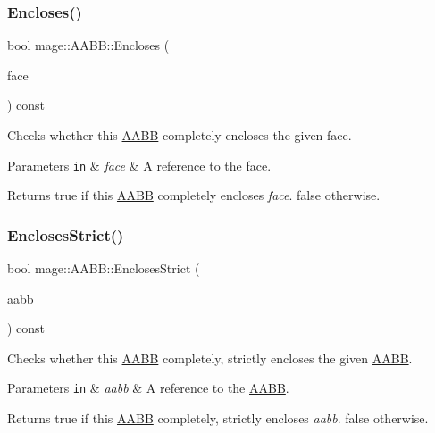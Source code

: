 \subsubsection{\texorpdfstring{Encloses()}{Encloses()}\hspace{0.1cm}{\footnotesize\ttfamily [3/3]}}
{\footnotesize\ttfamily bool mage\+::\+A\+A\+B\+B\+::\+Encloses (\begin{DoxyParamCaption}\item[{const \hyperlink{structmage_1_1_face}{Face} \&}]{face }\end{DoxyParamCaption}) const}

Checks whether this \hyperlink{structmage_1_1_a_a_b_b}{A\+A\+BB} completely encloses the given face.


\begin{DoxyParams}[1]{Parameters}
\mbox{\tt in}  & {\em face} & A reference to the face. \\
\hline
\end{DoxyParams}
\begin{DoxyReturn}{Returns}
{\ttfamily true} if this \hyperlink{structmage_1_1_a_a_b_b}{A\+A\+BB} completely encloses {\itshape face}. {\ttfamily false} otherwise. 
\end{DoxyReturn}
\hypertarget{structmage_1_1_a_a_b_b_a3bb59de6eca634cb3ddec4ad314fde21}{}\label{structmage_1_1_a_a_b_b_a3bb59de6eca634cb3ddec4ad314fde21} 
\subsubsection{\texorpdfstring{Encloses\+Strict()}{EnclosesStrict()}\hspace{0.1cm}{\footnotesize\ttfamily [1/3]}}
{\footnotesize\ttfamily bool mage\+::\+A\+A\+B\+B\+::\+Encloses\+Strict (\begin{DoxyParamCaption}\item[{const \hyperlink{structmage_1_1_a_a_b_b}{A\+A\+BB} \&}]{aabb }\end{DoxyParamCaption}) const}

Checks whether this \hyperlink{structmage_1_1_a_a_b_b}{A\+A\+BB} completely, strictly encloses the given \hyperlink{structmage_1_1_a_a_b_b}{A\+A\+BB}.


\begin{DoxyParams}[1]{Parameters}
\mbox{\tt in}  & {\em aabb} & A reference to the \hyperlink{structmage_1_1_a_a_b_b}{A\+A\+BB}. \\
\hline
\end{DoxyParams}
\begin{DoxyReturn}{Returns}
{\ttfamily true} if this \hyperlink{structmage_1_1_a_a_b_b}{A\+A\+BB} completely, strictly encloses {\itshape aabb}. {\ttfamily false} otherwise. 
\end{DoxyReturn}
\hypertarget{structmage_1_1_a_a_b_b_aeaae511f26763ce3ed22f841b3f04d95}{}\label{structmage_1_1_a_a_b_b_aeaae511f26763ce3ed22f841b3f04d95} 
